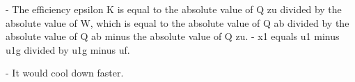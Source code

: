 - The efficiency epsilon K is equal to the absolute value of Q zu divided by the absolute value of W, which is equal to the absolute value of Q ab divided by the absolute value of Q ab minus the absolute value of Q zu.
- x1 equals u1 minus u1g divided by u1g minus uf.

- It would cool down faster.